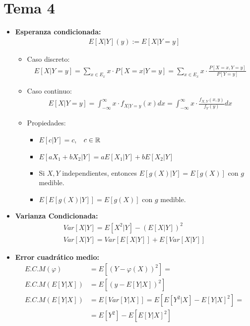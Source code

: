 \documentclass[12pt]{article}
\begin{document}
\portada[%
    titulo=Probabilidad,
    subtitulo=Resumen,
    autor=Jesús Muñoz Velasco,
    año=Curso 2024-2025]

    \section{Tema 4}

    \begin{itemize}
        \item \textbf{Esperanza condicionada:}
        \begin{gather*}
            E[X|Y](y):=E[X|Y=y]
        \end{gather*}
        \begin{itemize}
            \item Caso discreto:
            \begin{align*}
                E[X|Y=y] = \sum\limits_{x\in E_x} x \cdot P[X=x|Y=y] = \sum\limits_{x\in E_x} x \cdot \frac{P[X=x, Y=y]}{P[Y=y]}
            \end{align*}
            \item Caso continuo:
            \begin{align*}
                E[X|Y=y] = \int_{-\infty}^{\infty} x \cdot f_{X|Y=y}(x) dx = \int_{-\infty}^{\infty} x \cdot \frac{f_{X,Y}(x,y)}{f_Y(y)} dx
            \end{align*}
            \item Propiedades:
            \begin{itemize}
                \item $E[c|Y]=c$,\ \ $c\in \mathbb{R}$
                \item $E[aX_1 + bX_2|Y]=aE[X_1|Y]+ bE[X_2|Y]$
                \item Si $X,Y$ independientes, entonces $E[g(X)|Y]=E[g(X)]$ con $g$ medible.
                \item $E[E[g(X)|Y]]=E[g(X)]$ con $g$ medible.
            \end{itemize}
        \end{itemize}

        \item \textbf{Varianza Condicionada:}
        \begin{gather*}
            Var[X|Y]=E[X^2|Y]-(E[X|Y])^2\\
            Var[X|Y]=Var[E[X|Y]] + E[Var[X|Y]]
        \end{gather*}

        \item \textbf{Error cuadrático medio:}
        \begin{align*}
            E.C.M(\varphi) &= E[(Y-\varphi(X))^2] = \\
            E.C.M(E[Y|X]) &= E[(y-E[Y|X])^2]\\
            E.C.M(E[Y|X]) &= E[Var[Y|X]] = E[E[Y^2|X] - E[Y|X]^2] = \\
            &= E[Y^2]- E[E[Y|X]^2]
        \end{align*}


\end{itemize}
\end{document}
